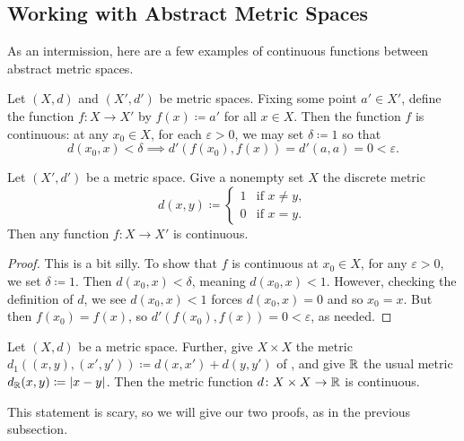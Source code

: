 \documentclass[../main.tex]{subfiles}
\begin{document}
\subsection{Working with Abstract Metric Spaces}
As an intermission, here are a few examples of continuous functions between abstract metric spaces.
\begin{example} \label{ex:const-is-cont}
    Let $(X,d)$ and $(X',d')$ be metric spaces. Fixing some point $a'\in X'$, define the function $f\colon X\to X'$ by $f(x)\coloneqq a'$ for all $x\in X$. Then the function $f$ is continuous: at any $x_0\in X$, for each $\varepsilon>0$, we may set $\delta\coloneqq1$ so that
    \[d(x_0,x)<\delta\implies d'(f(x_0),f(x))=d'(a,a)=0<\varepsilon.\]
\end{example}
\begin{example} \label{exe:discrete-is-cont}
    Let $(X',d')$ be a metric space. Give a nonempty set $X$ the discrete metric
    \[d(x,y)\coloneqq\begin{cases}
        1 & \text{if }x\ne y, \\
        0 & \text{if }x=y.
    \end{cases}\]
    Then any function $f\colon X\to X'$ is continuous.
\end{example}
\begin{proof}
    This is a bit silly. To show that $f$ is continuous at $x_0\in X$, for any $\varepsilon>0$, we set $\delta\coloneqq1$. Then $d(x_0,x)<\delta$, meaning $d(x_0,x)<1$. However, checking the definition of $d$, we see $d(x_0,x)<1$ forces $d(x_0,x)=0$ and so $x_0=x$. But then $f(x_0)=f(x)$, so $d'(f(x_0),f(x))=0<\varepsilon$, as needed.
\end{proof}
\begin{example}
    Let $(X,d)$ be a metric space. Further, give $X\times X$ the metric $d_1((x,y),(x',y'))\coloneqq d(x,x')+d(y,y')$ of , and give $\mathbb R$ the usual metric $d_\mathbb R(x,y)\coloneqq|x-y|$. Then the metric function $d\colon X\times X\to\mathbb R$ is continuous.
\end{example}
This statement is scary, so we will give our two proofs, as in the previous subsection.
\end{document}
